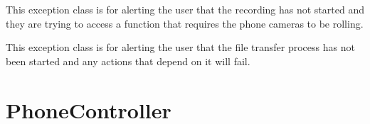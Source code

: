 \documentclass[letterpaper,10pt,english]{sphinxmanual}
\begin{document}

\begin{fulllineitems}
\label{\detokenize{index:src.Controllers.Exceptions.RecordingNotStartedException}}
This exception class is for alerting the user that the recording has not started and they
are trying to access a function that requires the phone cameras to be rolling.

\end{fulllineitems}


\begin{fulllineitems}
\label{\detokenize{index:src.Controllers.Exceptions.TransferNotStartedException}}
This exception class is for alerting the user that the file transfer process has not been
started and any actions that depend on it will fail.

\end{fulllineitems}



\chapter{PhoneController}
\label{\detokenize{index:module-src.Controllers.PhoneController}}\label{\detokenize{index:phonecontroller}}
\end{document}
